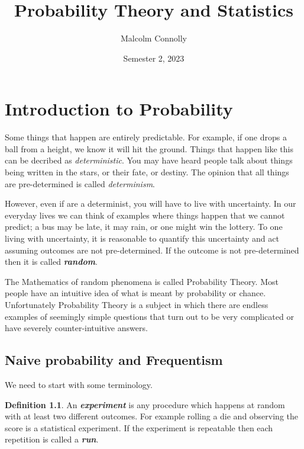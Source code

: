 \documentclass[
]{book}
\title{Probability Theory and Statistics}
\author{Malcolm Connolly}
\date{Semester 2, 2023}
\theoremstyle{definition}
\newtheorem{definition}{Definition}[chapter]
\theoremstyle{definition}
\theoremstyle{definition}
\theoremstyle{definition}
\theoremstyle{remark}
\begin{document}
\maketitle

{
\setcounter{tocdepth}{1}
\tableofcontents
}
\hypertarget{intro}{%
\chapter{Introduction to Probability}\label{intro}}

Some things that happen are entirely predictable. For example, if one drops a ball from a height, we know it will hit the ground. Things that happen like this can be decribed as \emph{deterministic}. You may have heard people talk about things being written in the stars, or their fate, or destiny. The opinion that all things are pre-determined is called \emph{determinism}.

However, even if are a determinist, you will have to live with uncertainty. In our everyday lives we can think of examples where things happen that we cannot predict; a bus may be late, it may rain, or one might win the lottery. To one living with uncertainty, it is reasonable to quantify this uncertainty and act assuming outcomes are not pre-determined. If the outcome is not pre-determined then it is called \textbf{\emph{random}}.

The Mathematics of random phenomena is called Probability Theory. Most people have an intuitive idea of what is meant by probability or chance. Unfortunately Probability Theory is a subject in which there are endless examples of seemingly simple questions that turn out to be very complicated or have severely counter-intuitive answers.

\hypertarget{naive-probability-and-frequentism}{%
\section{Naive probability and Frequentism}\label{naive-probability-and-frequentism}}

We need to start with some terminology.

\begin{definition}
\protect\hypertarget{def:experiment}{}\label{def:experiment}An \textbf{\emph{experiment}} is any procedure which happens at random with at least two different outcomes. For example rolling a die and observing the score is a statistical experiment. If the experiment is repeatable then each repetition is called a \textbf{\emph{run}}.
\end{definition}
\end{document}
